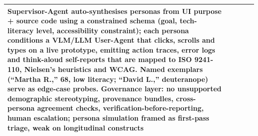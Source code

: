 \begin{table}[t]
\begin{tabular}{p{0.5cm} p{3.6cm} p{3.4cm} p{3.6cm} p{3.6cm}}
Supervisor-Agent auto-synthesises personas from UI purpose + source code using a constrained schema (goal, tech-literacy level, accessibility constraint); each persona conditions a VLM/LLM User-Agent that clicks, scrolls and types on a live prototype, emitting action traces, error logs and think-aloud self-reports that are mapped to ISO 9241-110, Nielsen's heuristics and WCAG. Named exemplars (``Martha R.,'' 68, low literacy; ``David L.,'' deuteranope) serve as edge-case probes. Governance layer: no unsupported demographic stereotyping, provenance bundles, cross-persona agreement checks, verification-before-reporting, human escalation; persona simulation framed as first-pass triage, weak on longitudinal constructs \\
\bottomrule
\end{tabular}
\end{table}
